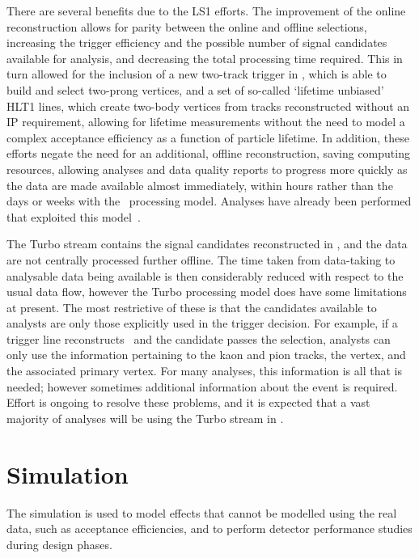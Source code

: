 There are several benefits due to the \ac{LS1} efforts.
The improvement of the online reconstruction allows for parity between the 
online and offline selections, increasing the trigger efficiency and the 
possible number of signal candidates available for analysis, and decreasing the 
total processing time required.
This in turn allowed for the inclusion of a new two-track trigger in \hltone, 
which is able to build and select two-prong vertices, and a set of so-called 
`lifetime unbiased' HLT1 lines, which create two-body vertices from tracks 
reconstructed without an \ac{IP} requirement, allowing for lifetime 
measurements without the need to model a complex acceptance efficiency as a 
function of particle lifetime.
In addition, these efforts negate the need for an additional, offline 
reconstruction, saving computing resources,
 allowing analyses and data quality reports to progress more quickly as the 
 data are made available almost immediately, within hours rather than the days 
 or weeks with the \runone\ processing model.
 Analyses have already been performed that exploited this 
 model~\cite{LHCb-PAPER-2015-037,Aaij:2015bpa,Aaij:2016jht}.

 The Turbo stream contains the signal candidates reconstructed in \hlttwo, and 
 the data are not centrally processed further offline.
 The time taken from data-taking to analysable data being available is then 
 considerably reduced with respect to the usual data flow, however the Turbo 
 processing model does have some limitations at present.
 The most restrictive of these is that the candidates available to analysts are 
 only those explicitly used in the trigger decision.
 For example, if a trigger line reconstructs \DzToKpi\ and the candidate passes 
 the selection, analysts can only use the information pertaining to the kaon 
 and pion tracks, the \PDzero vertex, and the associated primary vertex.
 For many analyses, this information is all that is needed; however sometimes 
 additional information about the event is required.
 Effort is ongoing to resolve these problems, and it is expected that a vast 
 majority of analyses will be using the Turbo stream in \runthree.

\section{Simulation}
\label{chap:intro:lhcb:simulation}

The simulation is used to model effects that cannot be modelled using the real 
data, such as acceptance efficiencies, and to perform detector performance 
studies during design phases.

